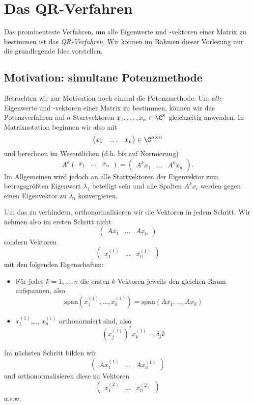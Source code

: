 \documentclass[
]{mycourse}
\theoremstyle{mythm}
\theoremstyle{break}
\begin{document}
\section{Das QR-Verfahren}

Das prominenteste Verfahren, um alle Eigenwerte und -vektoren einer Matrix zu bestimmen ist das \emph{QR-Verfahren}.
Wir können im Rahmen dieser Vorlesung nur die grundlegende Idee vorstellen.


\subsection{Motivation: simultane Potenzmethode}

Betrachten wir zur Motivation noch einmal die Potenzmethode. Um \emph{alle} Eigenwerte und
-vektoren einer Matrix zu bestimmen, können wir das Potenzverfahren auf $n$ Startvektoren $x_1,\ldots,x_n\in \C^n$ gleichzeitig anwenden.
In Matrixnotation beginnen wir also mit 
\[
\begin{pmatrix} x_1 & \ldots & x_n\end{pmatrix}\in \C^{n\times n}
\]
und berechnen im Wesentlichen (d.h. bis auf Normierung)
\[
A^k \begin{pmatrix} x_1 & \ldots & x_n\end{pmatrix}= \begin{pmatrix} A^k x_1 & \ldots & A^k x_n\end{pmatrix}.
\]
Im Allgemeinen wird jedoch an alle Startvektoren der Eigenvektor zum betragsgrößten Eigenwert $\lambda_1$ beteiligt sein und alle Spalten $A^k x_i$ werden gegen
einen Eigenvektor zu $\lambda_1$ konvergieren.

Um das zu verhindern, orthonormalisieren wir die Vektoren in jedem Schritt. Wir nehmen also im ersten Schritt nicht  
\[
\begin{pmatrix} A x_1 & \ldots & A x_n\end{pmatrix}
\]
sondern Vektoren
\[
\begin{pmatrix} x^{(1)}_1 & \ldots & x^{(1)}_n \end{pmatrix}
\]
mit den folgenden Eigenschaften:
\begin{itemize}
\item Für jedes $k=1,\ldots,n$ die ersten $k$ Vektoren jeweils den gleichen Raum aufspannen, also
\[
\mathrm{span} (x^{(1)}_1,\ldots,x^{(1)}_k ) = \mathrm{span} (A x_1,\ldots, A x_k)
\]
\item $x^{(1)}_1$,\ldots, $x^{(1)}_n$ orthonormiert sind, also
\[
(x^{(1)}_j)^*x^{(1)}_k=\delta_jk
\]
\end{itemize}
Im nächsten Schritt bilden wir 
\[
\begin{pmatrix} A x^{(1)}_1 & \ldots & A x^{(1)}_n \end{pmatrix}
\]
und orthonormalisieren diese zu Vektoren
\[
\begin{pmatrix} x^{(2)}_1 & \ldots & x^{(2)}_n \end{pmatrix}
\]
u.s.w.
\end{document}
